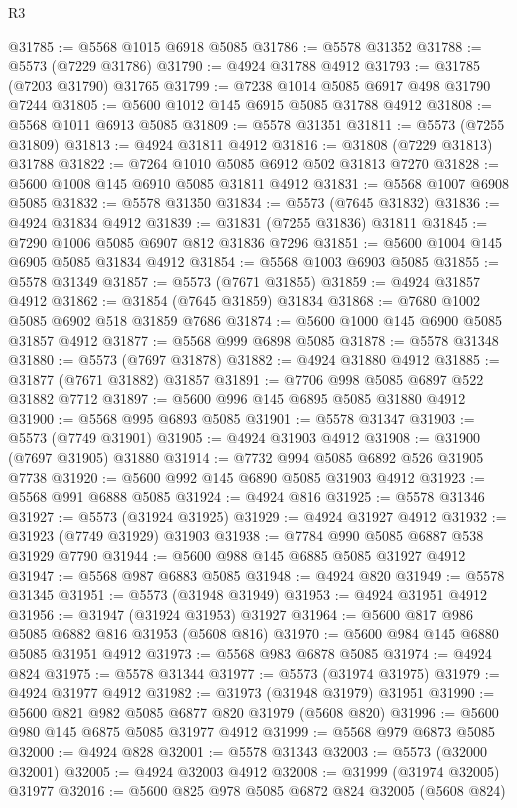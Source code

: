 \begin{lexlean}{R3}
\begin{coremodule}
@31785 := @5568 @1015 @6918 @5085
@31786 := @5578 @31352
@31788 := @5573 (@7229 @31786)
@31790 := @4924 @31788 @4912
@31793 := @31785 (@7203 @31790) @31765
@31799 := @7238 @1014 @5085 @6917 @498 @31790 @7244
@31805 := @5600 @1012 @145 @6915 @5085 @31788 @4912
@31808 := @5568 @1011 @6913 @5085
@31809 := @5578 @31351
@31811 := @5573 (@7255 @31809)
@31813 := @4924 @31811 @4912
@31816 := @31808 (@7229 @31813) @31788
@31822 := @7264 @1010 @5085 @6912 @502 @31813 @7270
@31828 := @5600 @1008 @145 @6910 @5085 @31811 @4912
@31831 := @5568 @1007 @6908 @5085
@31832 := @5578 @31350
@31834 := @5573 (@7645 @31832)
@31836 := @4924 @31834 @4912
@31839 := @31831 (@7255 @31836) @31811
@31845 := @7290 @1006 @5085 @6907 @812 @31836 @7296
@31851 := @5600 @1004 @145 @6905 @5085 @31834 @4912
@31854 := @5568 @1003 @6903 @5085
@31855 := @5578 @31349
@31857 := @5573 (@7671 @31855)
@31859 := @4924 @31857 @4912
@31862 := @31854 (@7645 @31859) @31834
@31868 := @7680 @1002 @5085 @6902 @518 @31859 @7686
@31874 := @5600 @1000 @145 @6900 @5085 @31857 @4912
@31877 := @5568 @999 @6898 @5085
@31878 := @5578 @31348
@31880 := @5573 (@7697 @31878)
@31882 := @4924 @31880 @4912
@31885 := @31877 (@7671 @31882) @31857
@31891 := @7706 @998 @5085 @6897 @522 @31882 @7712
@31897 := @5600 @996 @145 @6895 @5085 @31880 @4912
@31900 := @5568 @995 @6893 @5085
@31901 := @5578 @31347
@31903 := @5573 (@7749 @31901)
@31905 := @4924 @31903 @4912
@31908 := @31900 (@7697 @31905) @31880
@31914 := @7732 @994 @5085 @6892 @526 @31905 @7738
@31920 := @5600 @992 @145 @6890 @5085 @31903 @4912
@31923 := @5568 @991 @6888 @5085
@31924 := @4924 @816
@31925 := @5578 @31346
@31927 := @5573 (@31924 @31925)
@31929 := @4924 @31927 @4912
@31932 := @31923 (@7749 @31929) @31903
@31938 := @7784 @990 @5085 @6887 @538 @31929 @7790
@31944 := @5600 @988 @145 @6885 @5085 @31927 @4912
@31947 := @5568 @987 @6883 @5085
@31948 := @4924 @820
@31949 := @5578 @31345
@31951 := @5573 (@31948 @31949)
@31953 := @4924 @31951 @4912
@31956 := @31947 (@31924 @31953) @31927
@31964 := @5600 @817 @986 @5085 @6882 @816 @31953 (@5608 @816)
@31970 := @5600 @984 @145 @6880 @5085 @31951 @4912
@31973 := @5568 @983 @6878 @5085
@31974 := @4924 @824
@31975 := @5578 @31344
@31977 := @5573 (@31974 @31975)
@31979 := @4924 @31977 @4912
@31982 := @31973 (@31948 @31979) @31951
@31990 := @5600 @821 @982 @5085 @6877 @820 @31979 (@5608 @820)
@31996 := @5600 @980 @145 @6875 @5085 @31977 @4912
@31999 := @5568 @979 @6873 @5085
@32000 := @4924 @828
@32001 := @5578 @31343
@32003 := @5573 (@32000 @32001)
@32005 := @4924 @32003 @4912
@32008 := @31999 (@31974 @32005) @31977
@32016 := @5600 @825 @978 @5085 @6872 @824 @32005 (@5608 @824)

\end{coremodule}
\end{lexlean}
